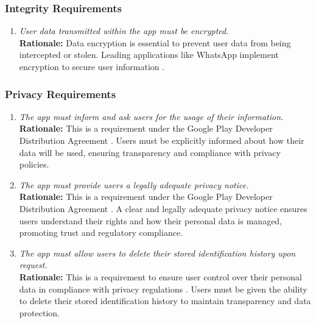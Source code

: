 \documentclass[]{article}
\begin{document}
\subsubsection{Integrity Requirements}
\label{ssub:integrity_requirements}
\begin{enumerate}[{SR-INT}1. ]
    \item \textit{User data transmitted within the app must be encrypted.}
    \\ \textbf{Rationale:} Data encryption is essential to prevent user data from being intercepted or stolen. Leading applications like WhatsApp implement encryption to secure user information \cite{EncryptionBestPractices}.
\end{enumerate}


\subsubsection{Privacy Requirements}
\label{ssub:privacy_requirements}
\begin{enumerate}[{SR-P}1. ]
    \item \textit{The app must inform and ask users for the usage of their information.}
    \\ \textbf{Rationale:} This is a requirement under the Google Play Developer Distribution Agreement \cite{GooglePlayAgreement}. Users must be explicitly informed about how their data will be used, ensuring transparency and compliance with privacy policies.

    \item \textit{The app must provide users a legally adequate privacy notice.}
    \\ \textbf{Rationale:} This is a requirement under the Google Play Developer Distribution Agreement \cite{GooglePlayAgreement}. A clear and legally adequate privacy notice ensures users understand their rights and how their personal data is managed, promoting trust and regulatory compliance.

    \item \textit{The app must allow users to delete their stored identification history upon request.}
    \\ \textbf{Rationale:} This is a requirement to ensure user control over their personal data in compliance with privacy regulations \cite{GooglePlayAgreement}. Users must be given the ability to delete their stored identification history to maintain transparency and data protection.
\end{enumerate}
\end{document}
